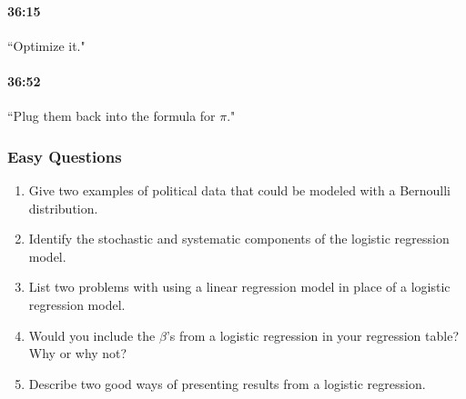 \documentclass[11pt]{article}
\begin{document}
\paragraph{36:15} ``Optimize it."
\paragraph{36:52} ``Plug them back into the formula for $\pi$."

\subsubsection{Easy Questions}
\begin{enumerate}
\item Give two examples of political data that could be modeled with a Bernoulli distribution. 

\item Identify the stochastic and systematic components of the logistic regression model.  

\item List two problems with using a linear regression model in place of a logistic regression model. 

\item Would you include the $\beta$'s from a logistic regression in your regression table? Why or why not? 

\item Describe two good ways of presenting results from a logistic regression. 

\end{enumerate}
\end{document}
